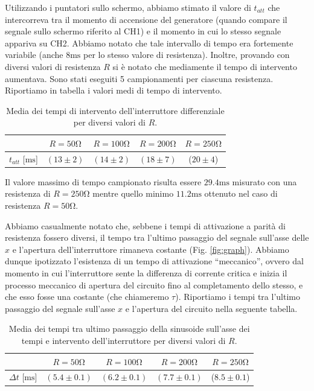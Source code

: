 Utilizzando i puntatori sullo schermo, abbiamo stimato il valore di $t_{att}$ che intercorreva tra il momento di accensione del generatore (quando compare il segnale sullo schermo riferito al CH1) e il momento in cui lo stesso segnale appariva su CH2. Abbiamo notato che tale intervallo di tempo era fortemente variabile (anche $8\si{\milli\second}$ per lo stesso valore di resistenza). Inoltre, provando con diversi valori di resistenza $R$ si è notato che mediamente il tempo di intervento aumentava. Sono stati eseguiti 5 campionamenti per ciascuna resistenza. Riportiamo in tabella i valori medi di tempo di intervento.

\begin{table}[h]
\centering
\caption{Media dei tempi di intervento dell'interruttore differenziale per diversi valori di $R$.}
{\renewcommand{\arraystretch}{1.6}%
\begin{tabular}{c|c|c|c|c}
 & $R=50 \si{\ohm}$ & $R=100 \si{\ohm}$ & $R=200 \si{\ohm}$ & $R=250 \si{\ohm}$ \\      \hline
$t_{att}$ [$\si{\milli\second}$] & $(13 \pm 2)$ & $(14 \pm 2)$ & $(18 \pm 7)$ & ($20 \pm 4$) \\\end{tabular}}
\end{table}


Il valore massimo di tempo campionato risulta essere $29.4\si{\milli\second}$ misurato con una resistenza di $R=250 \si{\ohm}$ mentre quello minimo $11.2\si{\milli\second}$ ottenuto nel caso di resistenza $R=50 \si{\ohm}$.

Abbiamo casualmente notato che, sebbene i tempi di attivazione a parità di resistenza fossero diversi, il tempo tra l'ultimo passaggio del segnale sull'asse delle $x$ e l'apertura dell'interruttore rimaneva costante (Fig. \ref{fig:graph}). Abbiamo dunque ipotizzato l'esistenza di un tempo di attivazione ``meccanico'', ovvero dal momento in cui l'interruttore sente la differenza di corrente critica e inizia il processo meccanico di apertura del circuito fino al completamento dello stesso, e che esso fosse una costante (che chiameremo $\tau$).  Riportiamo i tempi tra l'ultimo passaggio del segnale sull'asse $x$ e l'apertura del circuito nella seguente tabella. 

\begin{table}[h]
\centering
\parbox{14 cm}{\caption{Media dei tempi tra ultimo passaggio della sinusoide sull'asse dei tempi e intervento dell'interruttore per diversi valori di $R$.}}
{\renewcommand{\arraystretch}{1.6}%
\begin{tabular}{c|c|c|c|c}
 & $R=50 \si{\ohm}$ & $R=100 \si{\ohm}$ & $R=200 \si{\ohm}$ & $R=250 \si{\ohm}$ \\      \hline
$\Delta t$ [$\si{\milli\second}$] & $(5.4 \pm 0.1)$ & $(6.2 \pm 0.1)$ & $(7.7 \pm 0.1)$ & ($8.5 \pm 0.1$) \\
\end{tabular}}
\end{table}

